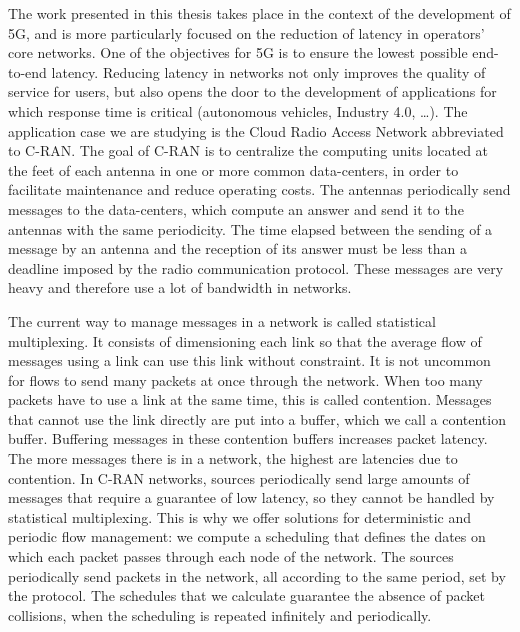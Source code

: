 \label{chap:introen}

The work presented in this thesis takes place in the context of the development of 5G, and is more particularly focused on the reduction of latency in operators' core networks.
One of the objectives for 5G is to ensure the lowest possible end-to-end latency.
Reducing latency in networks not only improves the quality of service for users, but also opens the door to the development of applications for which response time is critical (autonomous vehicles, Industry 4.0, \ldots).
The application case we are studying is the Cloud Radio Access Network abbreviated to C-RAN. The goal of C-RAN is to centralize the computing units located at the feet of each antenna in one or more common data-centers, in order to facilitate maintenance and reduce operating costs. The antennas periodically send messages to the data-centers, which compute an answer and send it to the antennas with the same periodicity. The time elapsed between the sending of a message by an antenna and the reception of its answer must be less than a deadline imposed by the radio communication protocol. These messages are very heavy and therefore use a lot of bandwidth in networks.

The current way to manage messages in a network is called statistical multiplexing. It consists of dimensioning each link so that the average flow of messages using a link can use this link without constraint. It is not uncommon for flows to send many packets at once through the network. When too many packets have to use a link at the same time, this is called contention. Messages that cannot use the link directly are put into a buffer, which we call a contention buffer. Buffering messages in these contention buffers increases packet latency. The more messages there is in a network, the highest are latencies due to contention. In C-RAN networks, sources periodically send large amounts of messages that require a guarantee of low latency, so they cannot be handled by statistical multiplexing. This is why we offer solutions for deterministic and periodic flow management: we compute a scheduling that defines the dates on which each packet passes through each node of the network. The sources periodically send packets in the network, all according to the same period, set by the protocol. The schedules that we calculate guarantee the absence of packet collisions, when the scheduling is repeated infinitely and periodically.

